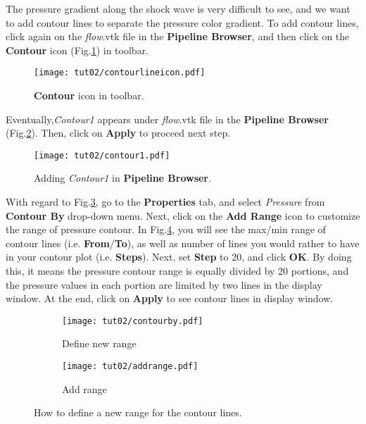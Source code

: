 The pressure gradient along the shock wave is very difficult to see, and we want to add contour lines to
separate the pressure color gradient. To add contour lines, click again on the \textit{flow}.vtk file in the \textbf{Pipeline Browser}, and then click on the \textbf{Contour} icon (Fig.\ref{fig2:contour_icon}) in toolbar.
\begin{figure}[htbp]
    \centering
    \texttt{[image: tut02/contourlineicon.pdf]}
    \caption{\textbf{Contour} icon in toolbar.}
    \label{fig2:contour_icon}
\end{figure}
Eventually,\textit{Contour1} appears under \textit{flow}.vtk file in the \textbf{Pipeline Browser} (Fig.\ref{fig2:contour1}). Then, click on \textbf{Apply} to proceed next step.
\begin{figure}[htbp]
    \centering
    \texttt{[image: tut02/contour1.pdf]}
    \caption{Adding \textit{Contour1} in \textbf{Pipeline Browser}.}
    \label{fig2:contour1}
\end{figure}
With regard to Fig.\ref{fig2:contourby a}, go to the \textbf{Properties} tab, and select \textit{Pressure} from \textbf{Contour By} drop-down menu. Next, click on the \textbf{Add Range} icon to customize the range of pressure contour. In Fig.\ref{fig2:contourby b}, you will see the max/min range of contour lines (i.e. \textbf{From}/\textbf{To}), as well as number of lines you would rather to have in your contour plot (i.e. \textbf{Steps}). Next, set \textbf{Step} to 20, and click \textbf{OK}. By doing this, it means the pressure contour range is equally divided by 20 portions, and the pressure values in each portion are limited by two lines in the display window. At the end, click on \textbf{Apply} to see contour lines in display window.
\begin{figure}[htbp]
    \centering
     \begin{subfigure}[b]{.4\textwidth}
         \centering
         \texttt{[image: tut02/contourby.pdf]}
         \caption{Define new range}
         \label{fig2:contourby a}
     \end{subfigure}
     \hfill
     \begin{subfigure}[b]{.4\textwidth}
         \centering
         \texttt{[image: tut02/addrange.pdf]}
         \caption{Add range}
         \label{fig2:contourby b}
     \end{subfigure}     
    \caption{How to define a new range for the contour lines.}
    \label{fig2:contourby}
\end{figure}

